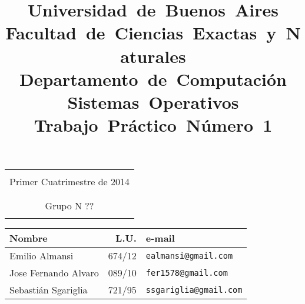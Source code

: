 \title{
	\mbox{\Huge Universidad de Buenos Aires}\\
	\mbox{\LARGE Facultad de Ciencias Exactas y Naturales}\\
	\mbox{\LARGE Departamento de Computación}\\
	\mbox{\LARGE Sistemas Operativos}\\
	\mbox{Trabajo Práctico Número 1}\\
}

\date{}

\maketitle

\thispagestyle{empty}

\begin{center}
	\begin{tabular}{c}
		\hline
		\\
		Primer Cuatrimestre de 2014\\
		\\
		\hline
		\\
		Grupo N ??
		\\
		\\
	\end{tabular}

	\begin{tabular}{|l|r|l|}
		\hline
		\textbf{Nombre} & \textbf{L.U.} & \textbf{e-mail}\\
		\hline
		Emilio Almansi & 674/12 & \verb"ealmansi@gmail.com"\\
		\hline
		Jose Fernando Alvaro & 089/10 & \verb"fer1578@gmail.com"\\
		\hline
		Sebastián Sgariglia & 721/95 & \verb"ssgariglia@gmail.com"\\
		\hline
	\end{tabular}
\end{center}

\vskip 5mm


